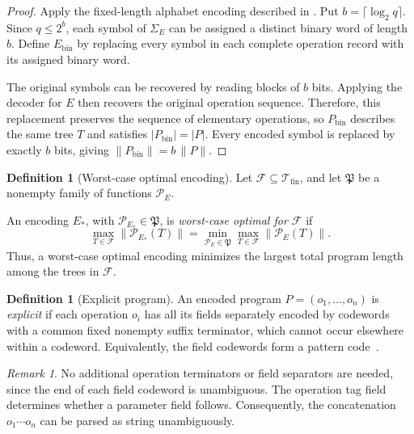 \documentclass{article}%
\theoremstyle{remark}
\newtheorem{remark}[theorem]{Remark}
\theoremstyle{definition}
\theoremstyle{definition}
\newtheorem{definition}[theorem]{Definition}
\theoremstyle{plain}
\begin{document}
\begin{proof}
Apply the fixed-length alphabet encoding described in
\cite[Section~2.5]{greenlaw_hoover_1998}. Put \(b=\lceil\log_2 q\rceil\). Since
\(q\leq 2^b\), each symbol of \(\Sigma_E\) can be assigned a distinct binary
word of length \(b\). Define \(E_{\mathrm{bin}}\) by replacing every symbol in
each complete operation record with its assigned binary word.

The original symbols can be recovered by reading blocks of \(b\) bits. Applying
the decoder for \(E\) then recovers the original operation sequence. Therefore,
this replacement preserves the sequence of elementary operations, so
\(P_{\mathrm{bin}}\) describes the same tree \(T\) and satisfies
\(|P_{\mathrm{bin}}|=|P|\). Every encoded symbol is replaced by exactly \(b\)
bits, giving \(\|P_{\mathrm{bin}}\|=b\,\|P\|\).
\end{proof}

\begin{definition}[Worst-case optimal encoding]
\label{def:worst-case-optimal-encoding}
Let \(\mathcal F\subseteq\mathcal{T}_\text{fin}\), and let \(\mathfrak P\) be a
nonempty family of functions \(\mathcal P_E\).

An encoding \(E_*\), with
\(\mathcal P_{E_*}\in\mathfrak P\), is
\emph{worst-case optimal for \(\mathcal F\)} if
\[
  \max_{T\in\mathcal F}
    \|\mathcal P_{E_*}(T)\|
  =
  \min_{\mathcal P_E\in\mathfrak P}
    \max_{T\in\mathcal F}
      \|\mathcal P_E(T)\|.
\]
Thus, a worst-case optimal encoding minimizes the largest total program length
among the trees in \(\mathcal F\).
\end{definition}

\begin{definition}[Explicit program]
An encoded program \(P=(o_1,\ldots,o_n)\) is \emph{explicit} if each operation
\(o_i\) has all its fields separately encoded by codewords with a common fixed
nonempty suffix terminator, which cannot occur elsewhere within a codeword.
Equivalently, the field codewords form a pattern
code~\cite{anisimov_zavadskyi_2017}.
\end{definition}

\begin{remark}
No additional operation terminators or field separators are needed, since the
end of each field codeword is unambiguous. The operation tag field determines
whether a parameter field follows. Consequently, the concatenation \(o_1\cdots
o_n\) can be parsed as string unambiguously.
\end{remark}
\end{document}
